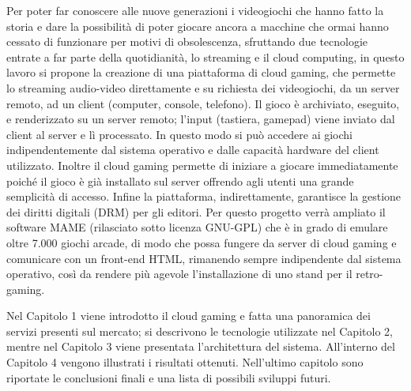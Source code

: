 %
%

Per poter far conoscere alle nuove generazioni i videogiochi che hanno fatto la storia e dare la possibilità di poter giocare ancora a macchine che ormai hanno cessato di funzionare per motivi di obsolescenza, sfruttando due tecnologie entrate a far parte della quotidianità, lo streaming e il cloud computing, in questo lavoro si propone la creazione di una piattaforma di cloud gaming, che permette lo streaming audio-video direttamente e su richiesta dei videogiochi, da un server remoto, ad un client (computer, console, telefono). Il gioco è archiviato, eseguito, e renderizzato su un server remoto; l'input (tastiera, gamepad) viene inviato dal client al server e lì processato. In questo modo si può accedere ai giochi indipendentemente dal sistema operativo e dalle capacità hardware del client utilizzato. Inoltre il cloud gaming permette di iniziare a giocare immediatamente poiché il gioco è già installato sul server offrendo agli utenti una grande semplicità di accesso. Infine la piattaforma, indirettamente, garantisce la gestione dei diritti digitali (DRM) per gli editori. Per questo progetto verrà ampliato il software MAME (rilasciato sotto licenza GNU-GPL) che è in grado di emulare oltre 7.000 giochi arcade, di modo che possa fungere da server di cloud gaming e comunicare con un front-end HTML, rimanendo sempre indipendente dal sistema operativo, così da rendere più agevole l’installazione di uno stand per il retro-gaming.

Nel Capitolo 1 viene introdotto il cloud gaming e fatta una panoramica dei servizi presenti sul mercato; si descrivono le tecnologie utilizzate nel Capitolo 2, mentre nel Capitolo 3 viene presentata l'architettura del sistema. All’interno del Capitolo 4 vengono illustrati i risultati ottenuti. Nell'ultimo capitolo sono riportate le conclusioni finali e una lista di possibili sviluppi futuri.